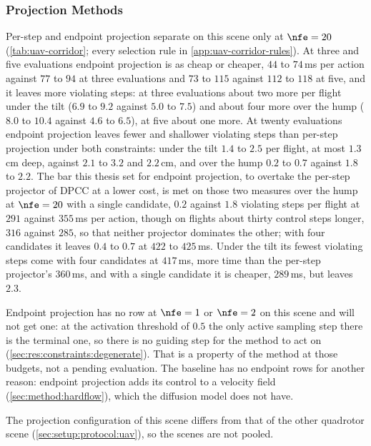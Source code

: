 \subsubsection{Projection Methods}\label{sec:res:uav:projection}
Per-step and endpoint projection separate on this scene only at $\nfe=20$
(\autoref{tab:uav-corridor}; every selection rule in \autoref{app:uav-corridor-rules}). At three and five
evaluations endpoint projection is as cheap or cheaper, $44$ to $74$\,ms per action against $77$ to $94$ at
three evaluations and $73$ to $115$ against $112$ to $118$ at five, and it leaves more violating steps: at
three evaluations about two more per flight under the tilt ($6.9$ to $9.2$ against $5.0$ to $7.5$) and about
four more over the hump ($8.0$ to $10.4$ against $4.6$ to $6.5$), at five about one more. At twenty
evaluations endpoint projection leaves fewer and shallower violating steps than per-step projection under
both constraints: under the tilt $1.4$ to $2.5$ per flight, at most $1.3$\,cm deep, against $2.1$ to $3.2$
and $2.2$\,cm, and over the hump $0.2$ to $0.7$ against $1.8$ to $2.2$. The bar this thesis set for endpoint
projection, to overtake the per-step projector of \ac{DPCC} at a lower cost, is met on those two measures over
the hump at $\nfe=20$ with a single candidate, $0.2$ against $1.8$ violating steps per flight at $291$
against $355$\,ms per action, though on flights about thirty control steps longer, $316$ against $285$, so that
neither projector dominates the other; with four candidates it leaves $0.4$ to $0.7$ at $422$ to $425$\,ms. Under the tilt
its fewest violating steps come with four candidates at $417$\,ms, more time than the per-step projector's
$360$\,ms, and with a single candidate it is cheaper, $289$\,ms, but leaves $2.3$.

Endpoint projection has no row at $\nfe=1$ or $\nfe=2$ on this scene and will not get one: at the
activation threshold of $0.5$ the only active sampling step there is the terminal one, so there is no
guiding step for the method to act on (\autoref{sec:res:constraints:degenerate}). That is a property of
the method at those budgets, not a pending evaluation. The baseline has no endpoint rows for another
reason: endpoint projection adds its control to a velocity field (\autoref{sec:method:hardflow}), which
the diffusion model does not have.

The projection configuration of this scene differs from that of the other quadrotor scene
(\autoref{sec:setup:protocol:uav}), so the scenes are not pooled.

